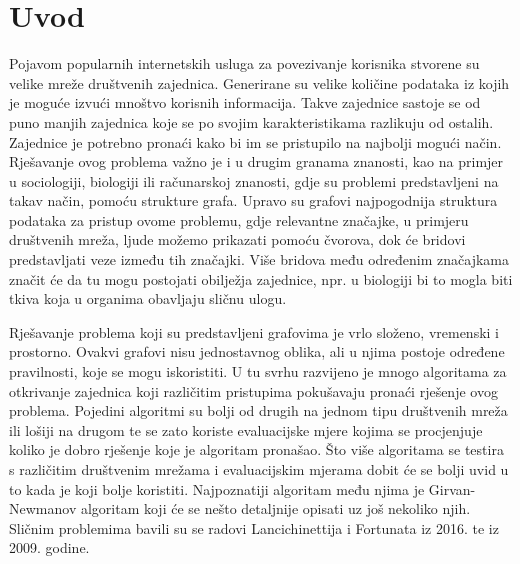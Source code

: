 \documentclass[times, utf8, diplomski]{fer}
\begin{document}






\tableofcontents

%
\chapter{Uvod}

Pojavom popularnih internetskih usluga za povezivanje korisnika stvorene su velike mreže društvenih zajednica. Generirane su velike količine podataka iz kojih je moguće izvući mnoštvo korisnih informacija. Takve zajednice sastoje se od puno manjih zajednica koje se po svojim karakteristikama razlikuju od ostalih. Zajednice je potrebno pronaći kako bi im se pristupilo na najbolji mogući način. Rješavanje ovog problema važno je i u drugim granama znanosti, kao na primjer u sociologiji, biologiji ili računarskoj znanosti, gdje su problemi predstavljeni na takav način, pomoću strukture grafa. Upravo su grafovi najpogodnija struktura podataka za pristup ovome problemu, gdje relevantne značajke, u primjeru društvenih mreža, ljude možemo prikazati pomoću čvorova, dok će bridovi predstavljati veze između tih značajki. Više bridova među određenim značajkama značit će da tu mogu postojati obilježja zajednice, npr. u biologiji bi to mogla biti tkiva koja u organima obavljaju sličnu ulogu. 

Rješavanje problema koji su predstavljeni grafovima je vrlo složeno, vremenski i prostorno. Ovakvi grafovi nisu jednostavnog oblika, ali u njima postoje određene pravilnosti, koje se mogu iskoristiti. U tu svrhu razvijeno je mnogo algoritama za otkrivanje zajednica koji različitim pristupima pokušavaju pronaći rješenje ovog problema. Pojedini algoritmi su bolji od drugih na jednom tipu društvenih mreža ili lošiji na drugom te se zato koriste evaluacijske mjere kojima se procjenjuje koliko je dobro rješenje koje je algoritam pronašao. Što više algoritama se testira s različitim društvenim mrežama i evaluacijskim mjerama dobit će se bolji uvid u to kada je koji bolje koristiti. Najpoznatiji algoritam među njima je Girvan-Newmanov algoritam koji će se nešto detaljnije opisati uz još nekoliko njih. Sličnim problemima bavili su se radovi Lancichinettija i Fortunata \cite{fortunato2016community} iz 2016. te \cite{lancichinetti2009community} iz 2009. godine.
\end{document}
